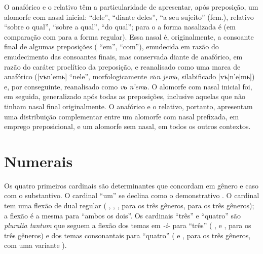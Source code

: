 O anafórico e o relativo têm a particularidade de apresentar, após
preposição, um alomorfe com nasal inicial: 
``dele'',  ``diante deles'',  ``a seu sujeito'' (fem.), relativo 
``sobre o qual'',  ``sobre a qual'',
 ``do qual''; para o  a forma
nasalizada é
 (em comparação com  para a forma regular).
Essa nasal é, originalmente, a consoante final de algumas preposições
( ``em'',  ``com''), emudecida em razão do
emudecimento das consoantes finais, mas conservada diante de anafórico,
em razão do caráter proclítico da preposição, e reanalisado como uma
marca de anafórico ([vъn'emь] ``nele'', morfologicamente \emph{vъn
jemь}, silabificado [vъ|n'e|mь]) e, por conseguinte,
reanalisado como \emph{vъ n'emь}. O alomorfe com nasal inicial foi, em
seguida, generalizado após todas as preposições, inclusive aquelas que
não tinham nasal final originalmente. O anafórico e o relativo,
portanto, apresentam uma distribuição complementar entre um alomorfe com
nasal prefixada, em emprego preposicional, e um alomorfe sem nasal, em
todos os outros contextos.


\section{Numerais}

Os quatro primeiros cardinais são determinantes que concordam em gênero
e caso com o substantivo. O cardinal  ``um'' se
declina como o demonstrativo . O cardinal  tem
uma flexão de dual regular ( , 
,  , 
 para os três
gêneros,   para os três gêneros); 
a flexão é a mesma para  ``ambos os dois''.
Os cardinais  ``três'' e  ``quatro'' são
\emph{pluralia tantum} que seguem a flexão dos temas em \emph{-i-} para
``três''
( ,  e 
,   para os três gêneros) e dos
temas consonantais para ``quatro'' ( 
 e  , 
 para os três gêneros, com uma variante
).

